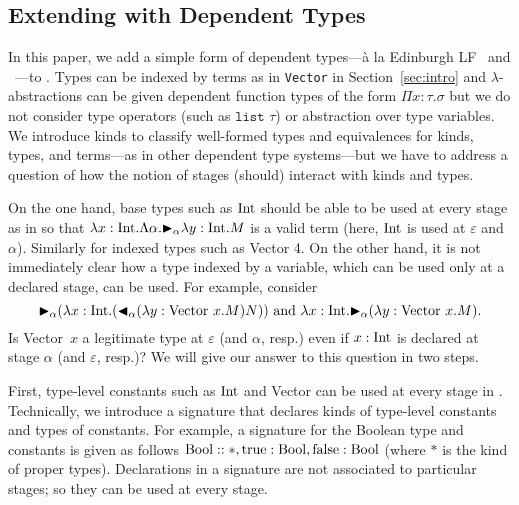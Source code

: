 \subsection{Extending \LTP with Dependent Types}


In this paper, we add a simple form of dependent types---{\`a} la Edinburgh
LF~\cite{harper1993framework} and \LLF~\cite{attapl}---to \LTP.  Types can be
indexed by terms as in \texttt{Vector} in Section~\ref{sec:intro} and
\(\lambda\)-abstractions can be given dependent function types of the form
\(\Pi x:\tau. \sigma\) but we do not consider type operators (such as
$\texttt{list } \tau$) or abstraction over type variables.  We introduce kinds
to classify well-formed types and equivalences for kinds, types, and terms---as
in other dependent type systems---but we have to address a question of how the
notion of stages (should) interact with kinds and types.


On the one hand, base types such as \(\textrm{Int}\) should be able to be used at every
stage as in \LTP so that \(\lambda x:\textrm{Int}.\Lambda \alpha. {\mathop{\blacktriangleright}}_\alpha \lambda
y:\textrm{Int}.M\) is a valid term (here, \(\textrm{Int}\) is used at \(\varepsilon\) and
\(\alpha\)). Similarly for indexed types such as Vector 4. On the other hand,
it is not immediately clear how a type indexed by a variable, which can be used
only at a declared stage, can be used. For example, consider
\[{\mathop{\blacktriangleright}}_\alpha (\lambda x:\textrm{Int}. ({\mathop{\blacktriangleleft}}_\alpha (\lambda y:\text{Vector
  }x.M)N) )
  \text{ and }
  \lambda x:\textrm{Int}. {\mathop{\blacktriangleright}}_\alpha (\lambda y:\text{Vector }x.M).
\]
Is Vector\ \(x\) a legitimate type at \(\varepsilon\) (and \(\alpha\), resp.)
even if \(x:\textrm{Int}\) is declared at stage \(\alpha\) (and \(\varepsilon\), resp.)?
We will give our answer to this question in two steps.


First, type-level constants such as \(\textrm{Int}\) and Vector can be used at every
stage in \LMD. Technically, we introduce a signature that declares kinds of
type-level constants and types of constants.  For example, a signature for the
Boolean type and constants is given as follows $\textrm{Bool}::*, \text{true}:\textrm{Bool},
\text{false}:\textrm{Bool}$ (where $*$ is the kind of proper types). Declarations in a
signature are not associated to particular stages; so they can be used at every
stage.


